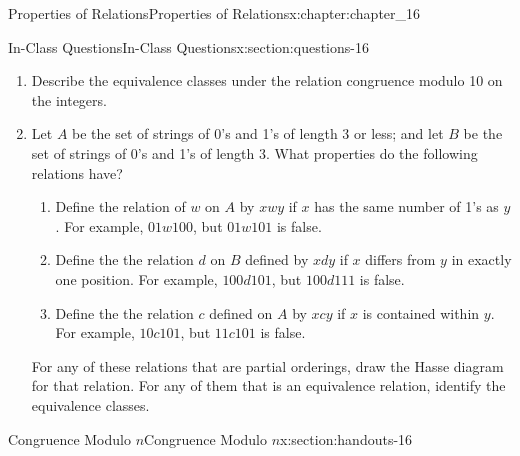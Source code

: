 \documentclass[oneside,10pt,]{book}
\newcommand{\terminology}[1]{\textbf{#1}}
\numberwithin{equation}{section}
\begin{document}
\begin{chapterptx}{Properties of Relations}{}{Properties of Relations}{}{}{x:chapter:chapter_16}
\begin{sectionptx}{In-Class Questions}{}{In-Class Questions}{}{}{x:section:questions-16}
\begin{enumerate}[label=\arabic*.]
\begin{equation*}
\end{equation*}
%
\begin{enumerate}[label=(\alph*)]
\item{}Verify that \(r\) is an equivalence relation on \(A\).%
\item{}Let \(a \in A\) and define \(c(a) = \{b \in A \mid a rb\}\). \label{g:notation:idm198360141056} \(c(a)\) is called the \terminology{equivalence class of \(a\) under \(r\)}. Find \(c(a)\) for each element \(a \in A\).%
\item{}Show that \(\{c(a) \mid  a \in A\}\) forms a partition of \(A\) for this set \(A\).%
\item{}Let \(r\) be an equivalence relation on an arbitrary set \(A\). Prove that the set of all equivalence classes under \(r\) constitutes a partition of \(A\).%
\end{enumerate}
%
\item{}Describe the equivalence classes under the relation congruence modulo 10 on the integers.%
\item{}Let \(A\) be the set of strings of 0's and 1's of length 3 or less; and let \(B\) be the set of strings of 0's and 1's of length 3. What properties do the following relations have?%
\begin{enumerate}[label=(\alph*)]
\item{}Define the relation of \(w\) on \(A\) by \(x w y\) if \(x\) has the same number of 1's as \(y\). For example, \(01 w 100\), but \(01 w 101\) is false.%
\item{}Define the the relation \(d\)  on \(B\) defined by \(x d y\) if \(x\) differs from \(y\) in exactly one position. For example, \(100 d 101\), but \(100 d 111\) is false.%
\item{}Define the the relation \(c\) defined  on \(A\) by \(x c y\) if \(x\) is contained within \(y\). For example, \(10 c 101\), but \(11 c 101\) is false.%
\end{enumerate}
For any of these relations that are partial orderings, draw the Hasse diagram for that relation.  For any of them that is an equivalence relation, identify the equivalence classes.%
\end{enumerate}
%
\end{sectionptx}
%
%
\typeout{************************************************}
\typeout{************************************************}
%
\begin{sectionptx}{Congruence Modulo \(n\)}{}{Congruence Modulo \(n\)}{}{}{x:section:handouts-16}

\end{sectionptx}
\end{chapterptx}
\end{document}
